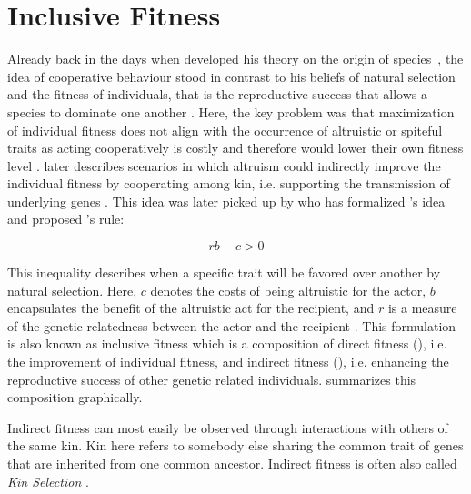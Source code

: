 \documentclass[sigconf]{acmart}
\begin{document}
    \section{Inclusive Fitness}\label{sec:inclusive-fitness}

    Already back in the days when \citeauthor{darwin_origin_1859} developed his theory on the origin of species~\cite{darwin_origin_1859}, the idea of cooperative behaviour stood in contrast to his beliefs of natural selection and the fitness of individuals, that is the reproductive success that allows a species to dominate one another \cite{pennisi_how_2005}.
    Here, the key problem was that maximization of individual fitness does not align with the occurrence of altruistic or spiteful traits as acting cooperatively is costly and therefore would lower their own fitness level \cite{west_altruism_2010}.
    \citeauthor{darwin_origin_1859} later describes scenarios in which altruism could indirectly improve the individual fitness by cooperating among kin, i.e. supporting the transmission of underlying genes \cite{pennisi_how_2005,gardner_theory_2009}.
    This idea was later picked up by \citeauthor{hamilton_kin_1964} who has formalized \citeauthor{darwin_origin_1859}'s idea and proposed \citeauthor{hamilton_kin_1964}'s rule:

    \begin{equation}
        rb-c>0\label{eq:rb-c}
    \end{equation}


    This inequality describes when a specific trait will be favored over another by natural selection.
    Here, $c$ denotes the costs of being altruistic for the actor, $b$ encapsulates the benefit of the altruistic act for the recipient, and $r$ is a measure of the genetic relatedness between the actor and the recipient \cite{west_altruism_2010}.
    This formulation is also known as inclusive fitness which is a composition of direct fitness (), i.e. the improvement of individual fitness, and indirect fitness (), i.e. enhancing the reproductive success of other genetic related individuals.
     summarizes this composition graphically.

    Indirect fitness can most easily be observed through interactions with others of the same kin.
    Kin here refers to somebody else sharing the common trait of genes that are inherited from one common ancestor.
    Indirect fitness is often also called \textit{Kin Selection} \cite{west_altruism_2010}.
\end{document}
